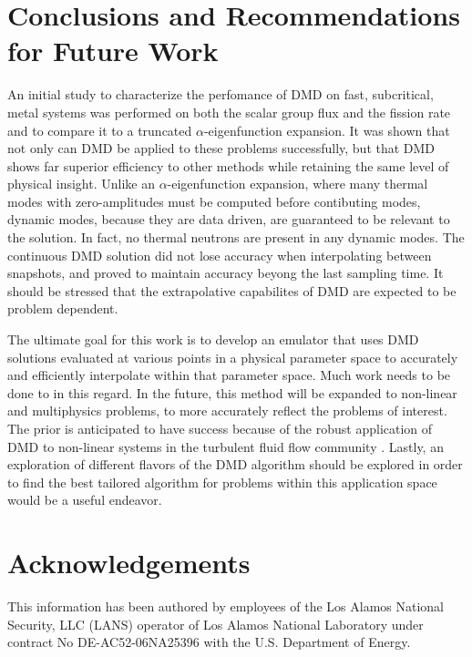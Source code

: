 \documentclass{style/nseJournal}
\begin{document}
\section{Conclusions and Recommendations for Future Work}
An initial study to characterize the perfomance of DMD on fast, subcritical, metal systems was performed on both the scalar group flux and the fission rate and to compare it to a truncated $\alpha$-eigenfunction expansion.  
It was shown that not only can DMD be applied to these problems successfully, but that DMD shows far superior efficiency to other methods while retaining the same level of physical insight.  
Unlike an $\alpha$-eigenfunction expansion, where many thermal modes with zero-amplitudes must be computed before contibuting modes, dynamic modes, because they are data driven, are guaranteed to be relevant to the solution.  
In fact, no thermal neutrons are present in any dynamic modes.  
The continuous DMD solution did not lose accuracy when interpolating between snapshots, and proved to maintain accuracy beyong the last sampling time.  
It should be stressed that the extrapolative capabilites of DMD are expected to be problem dependent.  

The ultimate goal for this work is to develop an emulator that uses DMD solutions evaluated at various points in a physical parameter space to accurately and efficiently interpolate within that parameter space.  
Much work needs to be done to in this regard.  
In the future, this method will be expanded to non-linear and multiphysics problems, to more accurately reflect the problems of interest.  
The prior is anticipated to have success because of the robust application of DMD to non-linear systems in the turbulent fluid flow community \cite{kutz2016dynamic} \cite{schmid2010dynamic}.  
Lastly, an exploration of different flavors of the DMD algorithm should be explored in order to find the best tailored algorithm for problems within this application space would be a useful endeavor.  

\section*{Acknowledgements}
This information has been authored by employees of the Los Alamos National 
Security, LLC (LANS) operator of Los Alamos National Laboratory under contract 
No DE-AC52-06NA25396 with the U.S. Department of Energy.

\pagebreak

\end{document}
